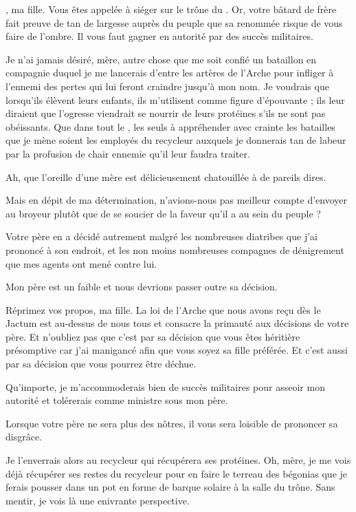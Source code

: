 \begin{drama}
  \reinespeaks \princesse, ma fille. Vous êtes appelée à siéger sur le trône du \campprincipal{}. Or, votre bâtard de frère fait preuve de tan de largesse auprès du peuple que sa renommée risque de vous faire de l’ombre. Il vous faut gagner en autorité par des succès militaires.

  \princessespeaks Je n’ai jamais désiré, mère, autre chose que me soit confié un bataillon en compagnie duquel je me lancerais d’entre les artères de l’Arche pour infliger à l’ennemi des pertes qui lui feront craindre jusqu’à mon nom. Je voudrais que lorsqu’ils élèvent leurs enfants, ils m’utilisent comme figure d’épouvante ; ils leur diraient que \princesse{}  l’ogresse viendrait se nourrir de leurs protéines s’ils ne sont pas obéissants. Que dans tout le \campprincipal{}, les seuls à appréhender avec crainte les batailles que je mène soient les employés du recycleur auxquels je donnerais tan de labeur par la profusion de chair ennemie qu’il leur faudra traiter.

  \reinespeaks Ah, que l’oreille d’une mère est délicieusement chatouillée à de pareils dires.

  \princessespeaks Mais en dépit de ma détermination, n’avions-nous pas meilleur compte d’envoyer \elena{} au broyeur plutôt que de se soucier de la faveur qu’il a au sein du peuple ?

  \reinespeaks Votre père en a décidé autrement malgré les nombreuses diatribes que j’ai prononcé à son endroit, et les non moins nombreuses compagnes de dénigrement que mes agents ont mené contre lui.

  \princessespeaks Mon père est un faible et nous devrions passer outre sa décision.

  \reinespeaks Réprimez vos propos, ma fille. La loi de l’Arche que nous avons reçu dès le Jactum est au-dessus de nous tous et consacre la primauté aux décisions de votre père. Et n’oubliez pas que c’est par sa décision que vous êtes héritière présomptive car j’ai manigancé afin que vous soyez sa fille préférée. Et c’est aussi par sa décision que vous pourrez être déchue.

  \princessespeaks Qu’importe, je m’accommoderais bien de succès militaires pour asseoir mon autorité et tolérerais \elena{} comme ministre sous mon père.

  \reinespeaks Lorsque votre père ne sera plus des nôtres, il vous sera loisible de prononcer sa disgrâce.

  \princessespeaks Je %
  l’enverrais alors au recycleur qui récupérera ses protéines. Oh, mère, je me vois déjà récupérer ses restes du recycleur pour en faire le terreau des bégonias que je ferais pousser dans un pot en forme de barque solaire à la salle du trône. Sans mentir, je vois là une enivrante perspective.


\end{drama}
